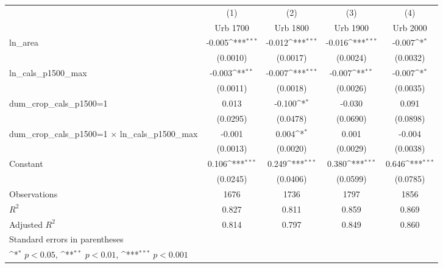 {
\def\sym#1{\ifmmode^{#1}\else\(^{#1}\)\fi}
\begin{tabular}{l*{4}{c}}
\toprule
                    &\multicolumn{1}{c}{(1)}&\multicolumn{1}{c}{(2)}&\multicolumn{1}{c}{(3)}&\multicolumn{1}{c}{(4)}\\
                    &\multicolumn{1}{c}{Urb 1700}&\multicolumn{1}{c}{Urb 1800}&\multicolumn{1}{c}{Urb 1900}&\multicolumn{1}{c}{Urb 2000}\\
\midrule
ln\_area             &      -0.005\sym{***}&      -0.012\sym{***}&      -0.016\sym{***}&      -0.007\sym{*}  \\
                    &    (0.0010)         &    (0.0017)         &    (0.0024)         &    (0.0032)         \\
\addlinespace
ln\_cals\_p1500\_max   &      -0.003\sym{**} &      -0.007\sym{***}&      -0.007\sym{**} &      -0.007\sym{*}  \\
                    &    (0.0011)         &    (0.0018)         &    (0.0026)         &    (0.0035)         \\
\addlinespace
dum\_crop\_cals\_p1500=1&       0.013         &      -0.100\sym{*}  &      -0.030         &       0.091         \\
                    &    (0.0295)         &    (0.0478)         &    (0.0690)         &    (0.0898)         \\
\addlinespace
dum\_crop\_cals\_p1500=1 $\times$ ln\_cals\_p1500\_max&      -0.001         &       0.004\sym{*}  &       0.001         &      -0.004         \\
                    &    (0.0013)         &    (0.0020)         &    (0.0029)         &    (0.0038)         \\
\addlinespace
Constant            &       0.106\sym{***}&       0.249\sym{***}&       0.380\sym{***}&       0.646\sym{***}\\
                    &    (0.0245)         &    (0.0406)         &    (0.0599)         &    (0.0785)         \\
\midrule
Observations        &        1676         &        1736         &        1797         &        1856         \\
\(R^{2}\)           &       0.827         &       0.811         &       0.859         &       0.869         \\
Adjusted \(R^{2}\)  &       0.814         &       0.797         &       0.849         &       0.860         \\
\bottomrule
\multicolumn{5}{l}{\footnotesize Standard errors in parentheses}\\
\multicolumn{5}{l}{\footnotesize \sym{*} \(p<0.05\), \sym{**} \(p<0.01\), \sym{***} \(p<0.001\)}\\
\end{tabular}
}
